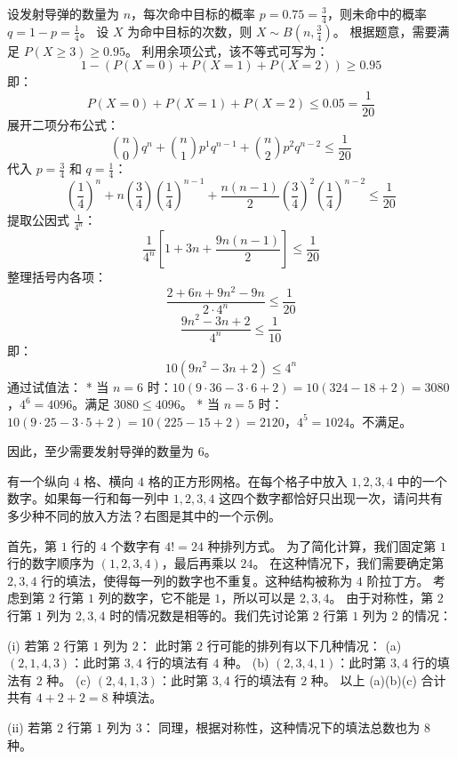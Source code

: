 \begin{questions}
\begin{solution}
设发射导弹的数量为 $n$，每次命中目标的概率 $p = 0.75 = \frac{3}{4}$，则未命中的概率 $q = 1 - p = \frac{1}{4}$。
设 $X$ 为命中目标的次数，则 $X \sim B(n, \frac{3}{4})$。
根据题意，需要满足 $P(X \geq 3) \geq 0.95$。
利用余项公式，该不等式可写为：
\[
1 - (P(X=0) + P(X=1) + P(X=2)) \geq 0.95
\]
即：
\[
P(X=0) + P(X=1) + P(X=2) \leq 0.05 = \frac{1}{20}
\]
展开二项分布公式：
\[
\binom{n}{0} q^n + \binom{n}{1} p^1 q^{n-1} + \binom{n}{2} p^2 q^{n-2} \leq \frac{1}{20}
\]
代入 $p = \frac{3}{4}$ 和 $q = \frac{1}{4}$：
\[
\left(\frac{1}{4}\right)^n + n \left(\frac{3}{4}\right) \left(\frac{1}{4}\right)^{n-1} + \frac{n(n-1)}{2} \left(\frac{3}{4}\right)^2 \left(\frac{1}{4}\right)^{n-2} \leq \frac{1}{20}
\]
提取公因式 $\frac{1}{4^n}$：
\[
\frac{1}{4^n} \left[ 1 + 3n + \frac{9n(n-1)}{2} \right] \leq \frac{1}{20}
\]
整理括号内各项：
\[
\frac{2 + 6n + 9n^2 - 9n}{2 \cdot 4^n} \leq \frac{1}{20}
\]
\[
\frac{9n^2 - 3n + 2}{4^n} \leq \frac{1}{10}
\]
即：
\[
10(9n^2 - 3n + 2) \leq 4^n
\]
通过试值法：
* 当 $n=6$ 时：$10(9 \cdot 36 - 3 \cdot 6 + 2) = 10(324 - 18 + 2) = 3080$，$4^6 = 4096$。满足 $3080 \leq 4096$。
* 当 $n=5$ 时：$10(9 \cdot 25 - 3 \cdot 5 + 2) = 10(225 - 15 + 2) = 2120$，$4^5 = 1024$。不满足。

因此，至少需要发射导弹的数量为 6。
\end{solution}

\question
有一个纵向 $4$ 格、横向 $4$ 格的正方形网格。在每个格子中放入 $1, 2, 3, 4$ 中的一个数字。如果每一行和每一列中 $1, 2, 3, 4$ 这四个数字都恰好只出现一次，请问共有多少种不同的放入方法？右图是其中的一个示例。
\begin{solution}
    首先，第 $1$ 行的 $4$ 个数字有 $4! = 24$ 种排列方式。
    为了简化计算，我们固定第 $1$ 行的数字顺序为 $(1, 2, 3, 4)$，最后再乘以 $24$。
    在这种情况下，我们需要确定第 $2, 3, 4$ 行的填法，使得每一列的数字也不重复。这种结构被称为 $4$ 阶拉丁方。
    考虑到第 $2$ 行第 $1$ 列的数字，它不能是 $1$，所以可以是 $2, 3, 4$。
    由于对称性，第 $2$ 行第 $1$ 列为 $2, 3, 4$ 时的情况数是相等的。我们先讨论第 $2$ 行第 $1$ 列为 $2$ 的情况：
    
    (i) 若第 $2$ 行第 $1$ 列为 $2$：
    此时第 $2$ 行可能的排列有以下几种情况：
    (a) $(2, 1, 4, 3)$：此时第 $3, 4$ 行的填法有 $4$ 种。
    (b) $(2, 3, 4, 1)$：此时第 $3, 4$ 行的填法有 $2$ 种。
    (c) $(2, 4, 1, 3)$：此时第 $3, 4$ 行的填法有 $2$ 种。
    以上 (a)(b)(c) 合计共有 $4 + 2 + 2 = 8$ 种填法。

    (ii) 若第 $2$ 行第 $1$ 列为 $3$：
    同理，根据对称性，这种情况下的填法总数也为 $8$ 种。


\end{solution}
\end{questions}
